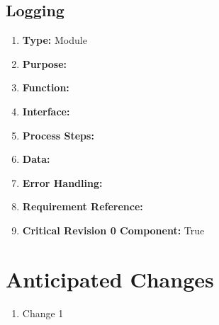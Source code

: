 \documentclass[paper=letter, fontsize=10pt]{scrartcl}
\numberwithin{equation}{section}		%
\numberwithin{figure}{section}			%
\numberwithin{table}{section}				%
\begin{document}
\subsection{Logging}
\begin{enumerate}[]
	\item \textbf{Type:} Module
	\item \textbf{Purpose:} 
	\item \textbf{Function:} 
	\item \textbf{Interface:}
	\item \textbf{Process Steps:} 
	\item \textbf{Data:}
	\item \textbf{Error Handling:}
	\item \textbf{Requirement Reference:}
	\item \textbf{Critical Revision 0 Component:} True
\end{enumerate}
\section{Anticipated Changes}
\begin{enumerate}[1]
	\item Change 1
\end{enumerate}

\end{document}
